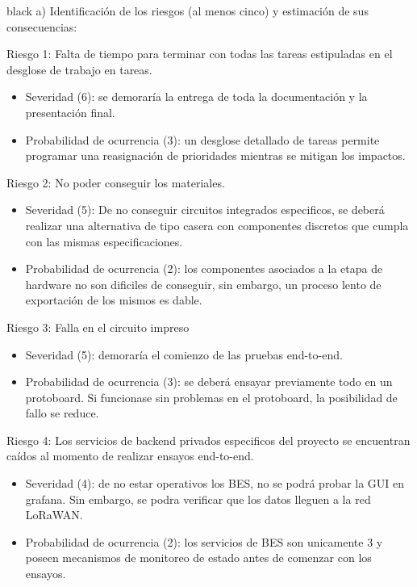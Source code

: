 \documentclass[11pt]{charter}
\begin{document}
\begin{consigna}{black}
a) Identificación de los riesgos (al menos cinco) y estimación de sus consecuencias:
 
Riesgo 1: Falta de tiempo para terminar con todas las tareas estipuladas en el desglose de trabajo en tareas.
\begin{itemize}
\item Severidad (6): se demoraría la entrega de toda la documentación y la presentación final.\\
\item Probabilidad de ocurrencia (3): un desglose detallado de tareas permite programar una reasignación de prioridades mientras se mitigan los impactos.\\
\end{itemize}   

Riesgo 2: No poder conseguir los materiales.
\begin{itemize}
\item Severidad (5): De no conseguir circuitos integrados especificos, se deberá realizar una alternativa de tipo casera con componentes discretos que cumpla con las mismas especificaciones.
\item Probabilidad de ocurrencia (2): los componentes asociados a la etapa de hardware no son dificiles de conseguir, sin embargo, un proceso lento de exportación de los mismos es dable.
\end{itemize}


Riesgo 3: Falla en el circuito impreso
\begin{itemize}
\item Severidad (5): demoraría el comienzo de las pruebas end-to-end.
\item Probabilidad de ocurrencia (3): se deberá ensayar previamente todo en un protoboard. Si funcionase sin problemas en el protoboard, la posibilidad de fallo se reduce.
\end{itemize}


Riesgo 4: Los servicios de backend privados especificos del proyecto se encuentran caídos al momento de realizar ensayos end-to-end.
\begin{itemize}
	\item Severidad (4): de no estar operativos los BES, no se podrá probar la GUI en grafana. Sin embargo, se podra verificar que los datos lleguen a la red LoRaWAN.
	\item Probabilidad de ocurrencia (2): los servicios de BES son unicamente 3 y poseen mecanismos de monitoreo de estado antes de comenzar con los ensayos.
\end{itemize}



\end{consigna}
\end{document}
